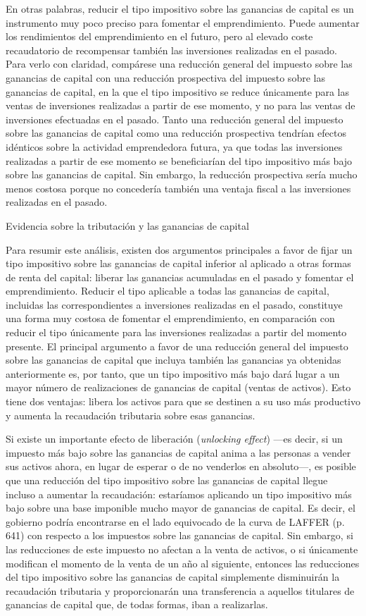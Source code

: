 \documentclass[10pt,a4paper]{article}
\begin{document}
En otras palabras, reducir el tipo impositivo sobre las ganancias de capital es un instrumento muy poco preciso para fomentar el emprendimiento. Puede aumentar los rendimientos del emprendimiento en el futuro, pero al elevado coste recaudatorio de recompensar también las inversiones realizadas en el pasado. Para verlo con claridad, compárese una reducción general del impuesto sobre las ganancias de capital con una reducción prospectiva del impuesto sobre las ganancias de capital, en la que el tipo impositivo se reduce únicamente para las ventas de inversiones realizadas a partir de ese momento, y no para las ventas de inversiones efectuadas en el pasado. Tanto una reducción general del impuesto sobre las ganancias de capital como una reducción prospectiva tendrían efectos idénticos sobre la actividad emprendedora futura, ya que todas las inversiones realizadas a partir de ese momento se beneficiarían del tipo impositivo más bajo sobre las ganancias de capital. Sin embargo, la reducción prospectiva sería mucho menos costosa porque no concedería también una ventaja fiscal a las inversiones realizadas en el pasado.

Evidencia sobre la tributación y las ganancias de capital

Para resumir este análisis, existen dos argumentos principales a favor de fijar un tipo impositivo sobre las ganancias de capital inferior al aplicado a otras formas de renta del capital: liberar las ganancias acumuladas en el pasado y fomentar el emprendimiento. Reducir el tipo aplicable a todas las ganancias de capital, incluidas las correspondientes a inversiones realizadas en el pasado, constituye una forma muy costosa de fomentar el emprendimiento, en comparación con reducir el tipo únicamente para las inversiones realizadas a partir del momento presente. El principal argumento a favor de una reducción general del impuesto sobre las ganancias de capital que incluya también las ganancias ya obtenidas anteriormente es, por tanto, que un tipo impositivo más bajo dará lugar a un mayor número de realizaciones de ganancias de capital (ventas de activos). Esto tiene dos ventajas: libera los activos para que se destinen a su uso más productivo y aumenta la recaudación tributaria sobre esas ganancias.

Si existe un importante efecto de liberación (\textit{unlocking effect}) —es decir, si un impuesto más bajo sobre las ganancias de capital anima a las personas a vender sus activos ahora, en lugar de esperar o de no venderlos en absoluto—, es posible que una reducción del tipo impositivo sobre las ganancias de capital llegue incluso a aumentar la recaudación: estaríamos aplicando un tipo impositivo más bajo sobre una base imponible mucho mayor de ganancias de capital. Es decir, el gobierno podría encontrarse en el lado equivocado de la curva de LAFFER (p. 641) con respecto a los impuestos sobre las ganancias de capital. Sin embargo, si las reducciones de este impuesto no afectan a la venta de activos, o si únicamente modifican el momento de la venta de un año al siguiente, entonces las reducciones del tipo impositivo sobre las ganancias de capital simplemente disminuirán la recaudación tributaria y proporcionarán una transferencia a aquellos titulares de ganancias de capital que, de todas formas, iban a realizarlas.
\end{document}
